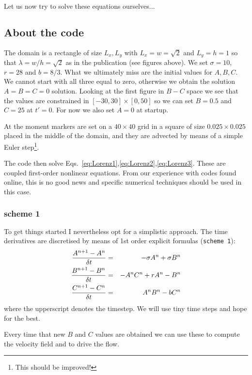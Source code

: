 Let us now try to solve these equations ourselves...

\subsection*{About the code}

The domain is a rectangle of size $L_x,L_y$ with $L_x=w=\sqrt 2$ and $L_y=h=1$
so that $\lambda=w/h=\sqrt 2$ as in the publication (see figures above).
We set $\sigma=10$, $r=28$ and $b=8/3$. 
What we ultimately miss are the initial values for $A,B,C$. We cannot start
with all three equal to zero, otherwise we obtain the solution $A=B=C=0$ solution.
Looking at the first figure in $B-C$ space we see that the values are constrained in 
$[-30,30]\times[0,50]$ so we can set $B=0.5$ and $C=25$ at $t'=0$. 
For now we also set $A=0$ at startup. 

At the moment markers are set on a $40\times 40$ grid in a square 
of size $0.025\times 0.025$ placed in the middle of the domain, and 
they are advected by means of a simple Euler step\footnote{This should be 
improved!}. 

The code then solve Eqs.~\eqref{eq:Lorenz1},\eqref{eq:Lorenz2},\eqref{eq:Lorenz3}.
These are coupled first-order nonlinear equations. From our experience with 
codes found online, this is no good news and 
specific numerical techniques should be used in this case. 

\subsubsection*{scheme 1}

To get things started I nevertheless opt for a simplistic approach. 
The time derivatives are discretised by means of 1st order explicit formulas ({\tt scheme 1}):
\begin{eqnarray}
\frac{A^{n+1}-A^n}{\delta t} &=& -\sigma A^n + \sigma B^n \nonumber\\
\frac{B^{n+1}-B^n}{\delta t} &=& -A^n C^n + rA^n -B^n  \nonumber\\
\frac{C^{n+1}-C^n}{\delta t} &=& A^n B^n - bC^n \nonumber
\end{eqnarray}
where the upperscript denotes the timestep. We will use tiny time steps and hope for the best.

Every time that new $B$ and $C$ values are obtained we can use these to compute the 
velocity field and to drive the flow.

